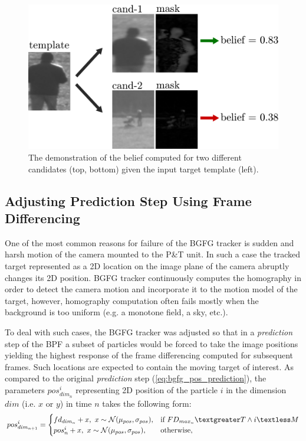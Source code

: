 \begin{figure}[htb]
	\centering
	\includegraphics[width=0.5\linewidth]{fig/belief.pdf}
	\caption{The demonstration of the belief computed for two different candidates (top, bottom) given the input target template (left).}
	\label{fig:belief}
\end{figure}

\subsection{Adjusting Prediction Step Using Frame Differencing} \label{txt:adjusting_prediction_step}

One of the most common reasons for failure of the BGFG tracker is sudden and harsh motion of the camera mounted to the P\&T unit. In such a case the tracked target represented as a 2D location on the image plane of the camera abruptly changes its 2D position. BGFG tracker continuously computes the homography \cite{ObjectTrackinginMonochromaticVideo} in order to detect the camera motion and incorporate it to the motion model of the target, however, homography computation often fails mostly when the background is too uniform (e.g. a monotone field, a sky, etc.).

To deal with such cases, the BGFG tracker was adjusted so that in a \textit{prediction} step of the BPF a subset of particles would be forced to take the image positions yielding the highest response of the frame differencing computed for subsequent frames. Such locations are expected to contain the moving target of interest. As compared to the original \textit{prediction} step (\ref{eq:bgfg_pos_prediction}), the parameters $pos_{dim_{n}}^{i}$ representing 2D position of the particle $i$ in the dimension $dim$ (i.e. $x$ or $y$) in time $n$ takes the following form:
\begin{align}
	pos_{dim_{n+1}}^{i} =
	\begin{cases}
		fd_{dim_{n}} + x, ~ x \sim \mathcal{N}(\mu_{pos}, \sigma_{pos}),  & \text{if}\ FD_{max_{n}} \textgreater T \land i \textless M \\
		pos_{n}^{i} + x, ~ x \sim \mathcal{N}(\mu_{pos}, \sigma_{pos}), & \text{otherwise},
	\end{cases}
\end{align}

